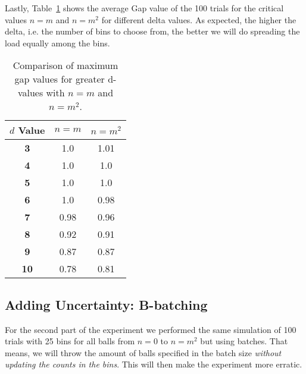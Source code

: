 \documentclass[a4paper, 11pt]{article}
\begin{document}
Lastly, Table~\ref{tab:comparison-normal-delta} shows the average Gap value of the 100 trials for the critical values $n=m$ and $n=m^2$ for different delta values. As expected, the higher the delta, i.e. the number of bins to choose from, the better we will do spreading the load equally among the bins.
\begin{table}[H]
    \centering
    \begin{tabular}{|c|c c|}
        \hline
        \textbf{$d$ Value} & $n = m$ & $n = m^2$ \\ \hline
        \textbf{3} & 1.0 & 1.01 \\ \hline
        \textbf{4} & 1.0 & 1.0 \\ \hline
        \textbf{5} & 1.0 & 1.0 \\ \hline
        \textbf{6} & 1.0 & 0.98 \\ \hline
        \textbf{7} & 0.98 & 0.96 \\ \hline
        \textbf{8} & 0.92 & 0.91 \\ \hline
        \textbf{9} & 0.87 & 0.87 \\ \hline
        \textbf{10} & 0.78 & 0.81 \\ \hline
    \end{tabular}
    \caption{Comparison of maximum gap values for greater d-values with $n = m$ and $n = m^2$.}
    \label{tab:comparison-normal-delta}
\end{table}

\clearpage
\subsection{Adding Uncertainty: B-batching}
For the second part of the experiment we performed the same simulation of 100 trials with 25 bins for all balls from $n=0$ to $n=m^2$ but using batches. That means, we will throw the amount of balls specified in the batch size \textit{without updating the counts in the bins}. This will then make the experiment more erratic. 
\end{document}
